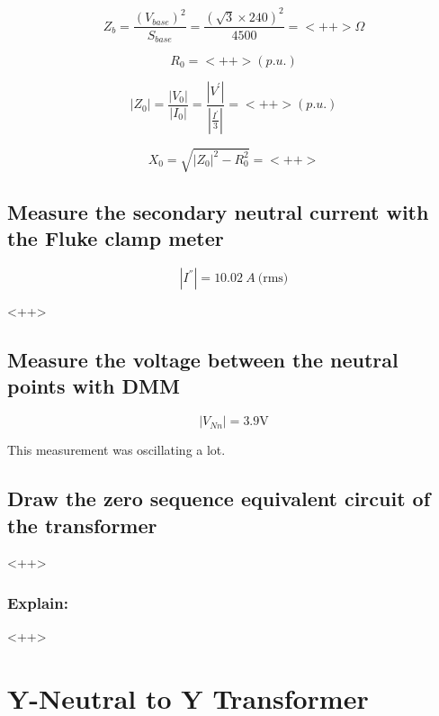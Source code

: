 \documentclass{article}
\begin{document}
\begin{equation}
  Z_b = \frac{ \left( V_{base} \right)^2  }{S_{base}} = \frac{\left( \sqrt{3} \times 240 \right)^2}{4500} = <++> \Omega
\end{equation}

\begin{equation}
  R_0 = <++> (p.u.)
\end{equation}

\begin{equation}
  |Z_0 | = \frac{| V_0 |}{| I_0 |} = \frac{| V^{'} |}{| \frac{I^{'}}{3} |} = <++> (p.u.)
\end{equation}

\begin{equation}
  X_{0} = \sqrt{| Z_0 |^{2} - R^2_0} = <++> 
\end{equation}

\subsection{Measure the secondary neutral current with the Fluke clamp meter} 

\begin{equation}
  | I^{''} | = 10.02 \ A \ \text{(rms)}
\end{equation}

<++>

\subsection{Measure the voltage between the neutral points with DMM} 
\begin{equation}
  | V_{Nn} | = 3.9 \text{V}
\end{equation}

This measurement was oscillating a lot.

\subsection{Draw the zero sequence equivalent circuit of the transformer}
<++>
\subsubsection{Explain:} 
<++>

\section{Y-Neutral to Y Transformer} 
\end{document}
